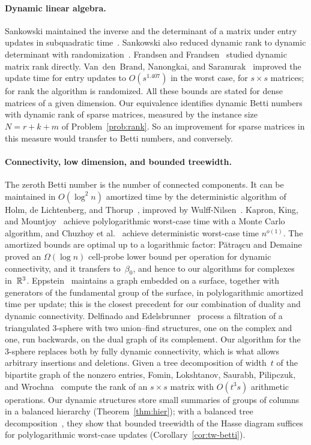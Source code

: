 \paragraph{Dynamic linear algebra.}
Sankowski maintained the inverse and the determinant of a matrix under entry updates in subquadratic time~\cite{San04}.
Sankowski also reduced dynamic rank to dynamic determinant with randomization~\cite{San07}.
Frandsen and Frandsen~\cite{FF09} studied dynamic matrix rank directly.
Van~den~Brand, Nanongkai, and Saranurak~\cite{vdBNS19} improved the update time for entry updates to $O(s^{1.407})$ in the worst case, for $s\times s$ matrices; for rank the algorithm is randomized.
All these bounds are stated for dense matrices of a given dimension.
Our equivalence identifies dynamic Betti numbers with dynamic rank of sparse matrices, measured by the instance size $N=r+k+m$ of Problem~\ref{prob:rank}.
So an improvement for sparse matrices in this measure would transfer to Betti numbers, and conversely.

\paragraph{Connectivity, low dimension, and bounded treewidth.}
The zeroth Betti number is the number of connected components.
It can be maintained in $O(\log^2 n)$ amortized time by the deterministic algorithm of Holm, de Lichtenberg, and Thorup~\cite{HDT01}, improved by Wulff-Nilsen~\cite{WN13}.
Kapron, King, and Mountjoy~\cite{KKM13} achieve polylogarithmic worst-case time with a Monte Carlo algorithm, and Chuzhoy et al.~\cite{CGLNPS20} achieve deterministic worst-case time $n^{o(1)}$.
The amortized bounds are optimal up to a logarithmic factor: P\u{a}tra\c{s}cu and Demaine~\cite{PD06} proved an $\Omega(\log n)$ cell-probe lower bound per operation for dynamic connectivity, and it transfers to~$\beta_0$, and hence to our algorithms for complexes in~$\mathbb{R}^3$.
Eppstein~\cite{Epp03} maintains a graph embedded on a surface, together with generators of the fundamental group of the surface, in polylogarithmic amortized time per update; this is the closest precedent for our combination of duality and dynamic connectivity.
Delfinado and Edelsbrunner~\cite{DE95} process a filtration of a triangulated $3$-sphere with two union--find structures, one on the complex and one, run backwards, on the dual graph of its complement.
Our algorithm for the $3$-sphere replaces both by fully dynamic connectivity, which is what allows arbitrary insertions and deletions.
Given a tree decomposition of width~$t$ of the bipartite graph of the nonzero entries, Fomin, Lokshtanov, Saurabh, Pilipczuk, and Wrochna~\cite{FLPSW18} compute the rank of an $s\times s$ matrix with $O(t^3s)$ arithmetic operations.
Our dynamic structures store small summaries of groups of columns in a balanced hierarchy (Theorem~\ref{thm:hier}); with a balanced tree decomposition~\cite{BH98}, they show that bounded treewidth of the Hasse diagram suffices for polylogarithmic worst-case updates (Corollary~\ref{cor:tw-betti}).

